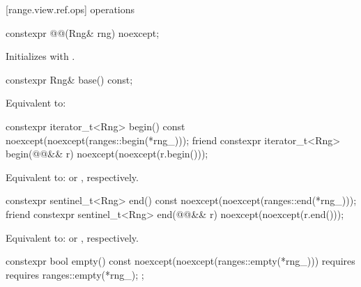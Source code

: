 {{[range.view.ref.ops]{ operations}

%
\begin{itemdecl}
constexpr @@(Rng& rng) noexcept;
\end{itemdecl}

\begin{itemdescr}
\pnum
\effects Initializes  with .
\end{itemdescr}

%
\begin{itemdecl}
constexpr Rng& base() const;
\end{itemdecl}

\begin{itemdescr}
\pnum
\effects Equivalent to: 
\end{itemdescr}

%
\begin{itemdecl}
constexpr iterator_t<Rng> begin() const
  noexcept(noexcept(ranges::begin(*rng_)));
friend constexpr iterator_t<Rng> begin(@@&& r)
  noexcept(noexcept(r.begin()));
\end{itemdecl}

\begin{itemdescr}
\pnum
\effects Equivalent to: 
or , respectively.
\end{itemdescr}

%
\begin{itemdecl}
constexpr sentinel_t<Rng> end() const
  noexcept(noexcept(ranges::end(*rng_)));
friend constexpr sentinel_t<Rng> end(@@&& r)
  noexcept(noexcept(r.end()));
\end{itemdecl}

\begin{itemdescr}
\pnum
\effects Equivalent to: 
or , respectively.
\end{itemdescr}

%
\begin{itemdecl}
constexpr bool empty() const
  noexcept(noexcept(ranges::empty(*rng_)))
  requires requires { ranges::empty(*rng_); };
\end{itemdecl}

}}
